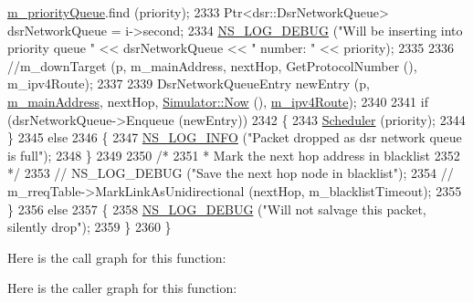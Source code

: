\begin{DoxyCode}
      \hyperlink{classns3_1_1dsr_1_1DsrRouting_a4606c3dfb1099afbfe1e7cd1d1c3c8ee}{m\_priorityQueue}.find (priority);
2333       Ptr<dsr::DsrNetworkQueue> dsrNetworkQueue = i->second;
2334       \hyperlink{group__logging_ga413f1886406d49f59a6a0a89b77b4d0a}{NS\_LOG\_DEBUG} (\textcolor{stringliteral}{"Will be inserting into priority queue "} << dsrNetworkQueue << \textcolor{stringliteral}{" number: "} 
      << priority);
2335 
2336       \textcolor{comment}{//m\_downTarget (p, m\_mainAddress, nextHop, GetProtocolNumber (), m\_ipv4Route);}
2337 
2339      DsrNetworkQueueEntry newEntry (p, \hyperlink{classns3_1_1dsr_1_1DsrRouting_a73182b5edee2d8460f28855e058fc9a0}{m\_mainAddress}, nextHop, 
      \hyperlink{classns3_1_1Simulator_ac3178fa975b419f7875e7105be122800}{Simulator::Now} (), \hyperlink{classns3_1_1dsr_1_1DsrRouting_ab4c16d56044159989e52ad33c0afed2b}{m\_ipv4Route});
2340 
2341      \textcolor{keywordflow}{if} (dsrNetworkQueue->Enqueue (newEntry))
2342        \{
2343          \hyperlink{classns3_1_1dsr_1_1DsrRouting_aa518edb174bccce1062304404424c6e0}{Scheduler} (priority);
2344        \}
2345      \textcolor{keywordflow}{else}
2346        \{
2347          \hyperlink{group__logging_gafbd73ee2cf9f26b319f49086d8e860fb}{NS\_LOG\_INFO} (\textcolor{stringliteral}{"Packet dropped as dsr network queue is full"});
2348        \}
2349 
2350       \textcolor{comment}{/*}
2351 \textcolor{comment}{       * Mark the next hop address in blacklist}
2352 \textcolor{comment}{       */}
2353 \textcolor{comment}{//      NS\_LOG\_DEBUG ("Save the next hop node in blacklist");}
2354 \textcolor{comment}{//      m\_rreqTable->MarkLinkAsUnidirectional (nextHop, m\_blacklistTimeout);}
2355     \}
2356   \textcolor{keywordflow}{else}
2357     \{
2358       \hyperlink{group__logging_ga413f1886406d49f59a6a0a89b77b4d0a}{NS\_LOG\_DEBUG} (\textcolor{stringliteral}{"Will not salvage this packet, silently drop"});
2359     \}
2360 \}
\end{DoxyCode}


Here is the call graph for this function\+:




Here is the caller graph for this function\+:


